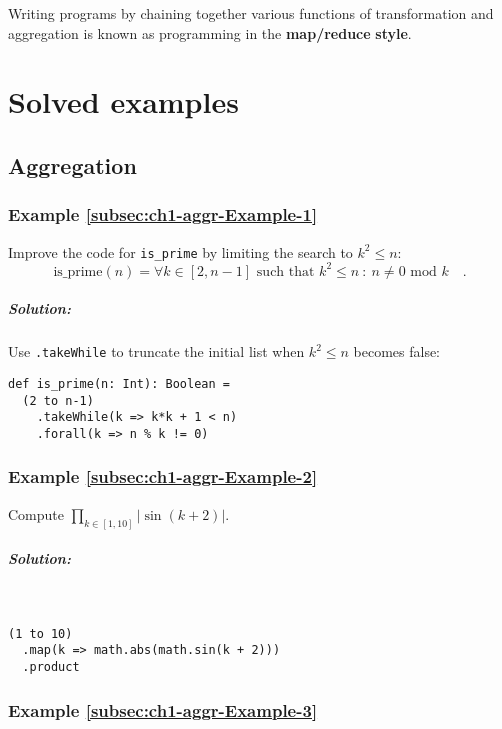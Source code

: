 Writing programs by chaining together various functions of transformation
and aggregation is known as programming in the \textbf{map/reduce}
\textbf{style}.

\section{Solved examples}

\subsection{Aggregation }

\subsubsection{Example \label{subsec:ch1-aggr-Example-1}\ref{subsec:ch1-aggr-Example-1}}

Improve the code for \lstinline!is_prime!
by limiting the search to $k^{2}\leq n$:
\[
\text{is\_prime}\left(n\right)=\forall k\in\left[2,n-1\right]\text{ such that }k^{2}\leq n\ :\ n\neq0\text{ mod }k\quad.
\]


\subparagraph{Solution:}

Use \lstinline!.takeWhile!
to truncate the initial list when $k^{2}\leq n$ becomes false:
\begin{lstlisting}
def is_prime(n: Int): Boolean =
  (2 to n-1)
    .takeWhile(k => k*k + 1 < n)
    .forall(k => n % k != 0)
\end{lstlisting}

\subsubsection{Example \label{subsec:ch1-aggr-Example-2}\ref{subsec:ch1-aggr-Example-2}}

Compute $\prod_{k\in\left[1,10\right]}\left|\sin\left(k+2\right)\right|$.

\subparagraph{Solution:}

~
\begin{lstlisting}
(1 to 10)
  .map(k => math.abs(math.sin(k + 2)))
  .product
\end{lstlisting}

\subsubsection{Example \label{subsec:ch1-aggr-Example-3}\ref{subsec:ch1-aggr-Example-3}}

